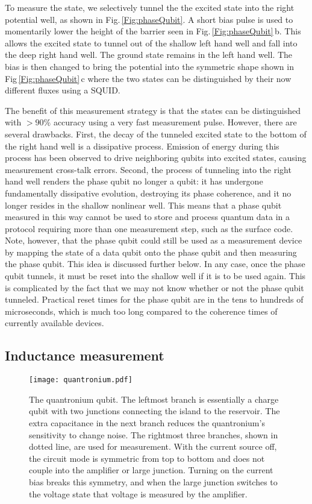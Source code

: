 To measure the state, we selectively tunnel the the excited state into the right potential well, as shown in Fig.\,\ref{Fig:phaseQubit}.
A short bias pulse is used to momentarily lower the height of the barrier seen in Fig.\,\ref{Fig:phaseQubit}\,b.
This allows the excited state to tunnel out of the shallow left hand well and fall into the deep right hand well.
The ground state remains in the left hand well.
The bias is then changed to bring the potential into the symmetric shape shown in Fig\,\ref{Fig:phaseQubit}\,c where the two states can be distinguished by their now different fluxes using a SQUID.

The benefit of this measurement strategy is that the states can be distinguished with $>90\%$ accuracy using a very fast measurement pulse.
However, there are several drawbacks.
First, the decay of the tunneled excited state to the bottom of the right hand well is a dissipative process.
Emission of energy during this process has been observed to drive neighboring qubits into excited states, causing measurement cross-talk errors.
Second, the process of tunneling into the right hand well renders the phase qubit no longer a qubit: it has undergone fundamentally dissipative evolution, destroying its phase coherence, and it no longer resides in the shallow nonlinear well.
This means that a phase qubit measured in this way cannot be used to store and process quantum data in a protocol requiring more than one measurement step, such as the surface code.
Note, however, that the phase qubit could still be used as a measurement device by mapping the state of a data qubit onto the phase qubit and then measuring the phase qubit.
This idea is discussed further below.
In any case, once the phase qubit tunnels, it must be reset into the shallow well if it is to be used again.
This is complicated by the fact that we may not know whether or not the phase qubit tunneled.
Practical reset times for the phase qubit are in the tens to hundreds of microseconds, which is much too long compared to the coherence times of currently available devices.

\subsection{Inductance measurement}

\begin{figure}
\begin{centering}
\texttt{[image: quantronium.pdf]} 
\par\end{centering}
\caption{The quantronium qubit. The leftmost branch is essentially a charge qubit with two junctions connecting the island to the reservoir. The extra capacitance in the next branch reduces the quantronium's sensitivity to change noise. The rightmost three branches, shown in dotted line, are used for measurement. With the current source off, the circuit mode is symmetric from top to bottom and does not couple into the amplifier or large junction. Turning on the current bias breaks this symmetry, and when the large junction switches to the voltage state that voltage is measured by the amplifier.}
\label{Fig:quantronium}
\end{figure}

